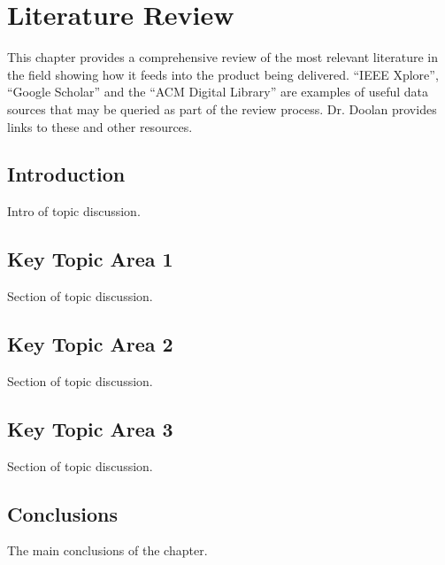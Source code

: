 \chapter{Literature Review}\label{ch:litReview}

This chapter provides a comprehensive review of the most relevant literature in the field showing how it feeds into the product being delivered. ``IEEE Xplore'', ``Google Scholar'' and the ``ACM Digital Library'' are examples of useful data sources that may be queried as part of the review process. Dr. Doolan \cite{online:Doolan:2016:AcademicResources} provides links to these and other resources. 

\section{Introduction}
Intro of topic discussion.

\section{Key Topic Area 1}
Section of topic discussion.

\section{Key Topic Area 2}
Section of topic discussion.

\section{Key Topic Area 3}
Section of topic discussion.

\section{Conclusions}

The main conclusions of the chapter.


